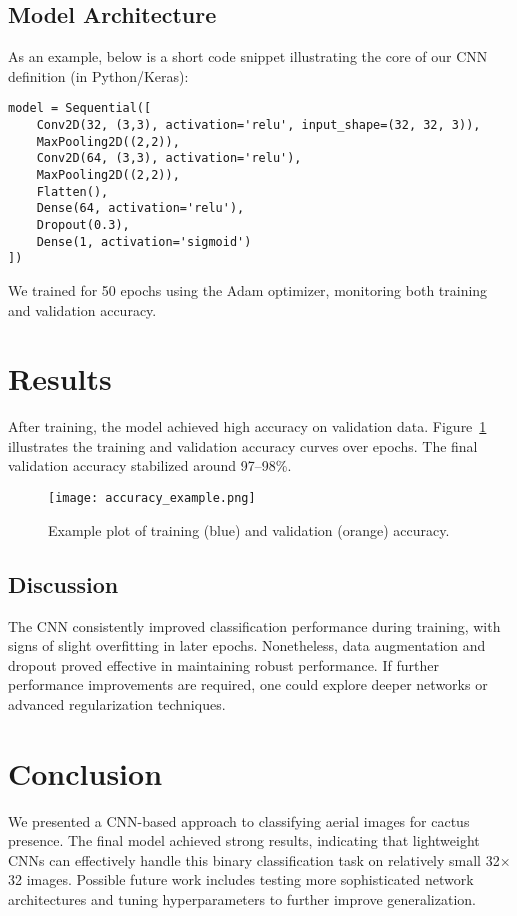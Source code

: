 \documentclass[12pt]{article}
\begin{document}
\subsection{Model Architecture}
As an example, below is a short code snippet illustrating the core of our CNN definition (in Python/Keras):
\begin{verbatim}
model = Sequential([
    Conv2D(32, (3,3), activation='relu', input_shape=(32, 32, 3)),
    MaxPooling2D((2,2)),
    Conv2D(64, (3,3), activation='relu'),
    MaxPooling2D((2,2)),
    Flatten(),
    Dense(64, activation='relu'),
    Dropout(0.3),
    Dense(1, activation='sigmoid')
])
\end{verbatim}

We trained for 50 epochs using the Adam optimizer, monitoring both training and validation accuracy.

\section{Results}
After training, the model achieved high accuracy on validation data. Figure~\ref{fig:acc_plot} 
illustrates the training and validation accuracy curves over epochs. The final validation accuracy 
stabilized around 97--98\%.

\begin{figure}[h!]
\centering
\texttt{[image: accuracy\_example.png]}
\caption{Example plot of training (blue) and validation (orange) accuracy.}
\label{fig:acc_plot}
\end{figure}

\subsection{Discussion}
The CNN consistently improved classification performance during training, with signs of slight 
overfitting in later epochs. Nonetheless, data augmentation and dropout proved effective in 
maintaining robust performance. If further performance improvements are required, one could explore 
deeper networks or advanced regularization techniques.

\section{Conclusion}
We presented a CNN-based approach to classifying aerial images for cactus presence. The final 
model achieved strong results, indicating that lightweight CNNs can effectively handle this 
binary classification task on relatively small 32$\times$32 images. Possible future work includes 
testing more sophisticated network architectures and tuning hyperparameters to further improve 
generalization.
\end{document}
